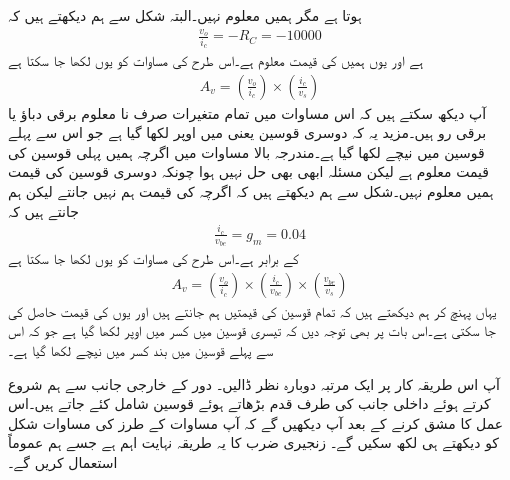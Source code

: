 ہوتا ہے مگر ہمیں معلوم نہیں۔البتہ شکل سے ہم دیکھتے ہیں کہ
\begin{align*}
\frac{v_o}{i_c}=-R_C=\num{-10000}
\end{align*}
ہے اور یوں ہمیں  کی قیمت معلوم ہے۔اس طرح  کی مساوات کو یوں لکھا جا سکتا ہے
\begin{align*}
A_v = \left(\frac{v_o}{i_c} \right ) \times \left(\frac{i_c}{v_s} \right )
\end{align*}
آپ دیکھ سکتے ہیں کہ اس مساوات میں تمام متغیرات صرف نا معلوم برقی دباؤ یا برقی رو ہیں۔مزید یہ کہ دوسری قوسین یعنی  میں اوپر   لکھا گیا ہے جو اس سے پہلے قوسین میں نیچے لکھا گیا ہے۔مندرجہ بالا مساوات میں اگرچہ ہمیں پہلی قوسین کی قیمت معلوم ہے لیکن مسئلہ ابھی بھی حل نہیں ہوا چونکہ دوسری قوسین کی قیمت ہمیں معلوم نہیں۔شکل سے ہم دیکھتے ہیں کہ اگرچہ   کی قیمت ہم نہیں جانتے لیکن ہم جانتے ہیں کہ
\begin{align*}
\frac{i_c}{v_{be}}=g_m=\num{0.04}
\end{align*}
کے برابر ہے۔اس طرح   کی مساوات کو یوں لکھا جا سکتا ہے
\begin{align*}
A_v=\left(\frac{v_o}{i_c} \right ) \times \left(\frac{i_c}{v_{be}} \right ) \times \left(\frac{v_{be}}{v_s} \right ) 
\end{align*}
یہاں پہنچ کر ہم دیکھتے ہیں کہ تمام قوسین کی قیمتیں ہم جانتے ہیں اور یوں  کی قیمت حاصل کی جا سکتی ہے۔اس بات پر بھی توجہ دیں کہ تیسری قوسین میں کسر میں اوپر  لکھا گیا ہے جو کہ اس سے پہلے قوسین میں بند کسر میں نیچے لکھا گیا ہے۔

آپ اس طریقہ کار پر ایک مرتبہ دوبارہ نظر ڈالیں۔ دور کے خارجی جانب   سے  ہم شروع کرتے ہوئے داخلی جانب   کی طرف قدم بڑھاتے ہوئے قوسین شامل کئے جاتے ہیں۔اس عمل کا مشق کرنے کے بعد آپ دیکھیں گے کہ آپ مساوات   کے طرز کی مساوات شکل کو دیکھتے ہی لکھ سکیں گے۔ زنجیری ضرب کا یہ طریقہ نہایت اہم ہے جسے ہم عموماً استعمال کریں گے۔

